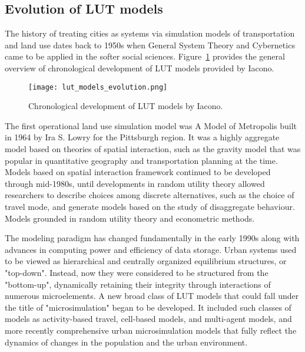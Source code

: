\subsection{Evolution of LUT models} \label{subsec:evolution_of_lut_models}

The history of treating cities as systems via simulation models of transportation and land use dates back to 1950s when General System Theory and Cybernetics came to be applied in the softer social sciences\cite{Batty2008}.
Figure~\ref{fig:lut_model_evolution} provides the general overview of chronological development of LUT models provided by Iacono\cite{Iacono2008}.

\begin{figure}[hbt!]
    \centering
    \texttt{[image: lut\_models\_evolution.png]}
    \caption{Chronological development of LUT models by Iacono\cite{Iacono2008}.}
    \label{fig:lut_model_evolution}
\end{figure}

The first operational land use simulation model was A Model of Metropolis built in 1964 by Ira S. Lowry for the Pittsburgh region\cite{Lowry1964}.
It was a highly aggregate model based on theories of spatial interaction, such as the gravity model that was popular in quantitative geography and transportation planning at the time\cite{Bouchard1965}.
Models based on spatial interaction framework continued to be developed through mid-1980s, until developments in random utility theory allowed researchers to describe choices among discrete alternatives, such as the choice of travel mode, and generate models based on the study of disaggregate behaviour.
Models grounded in random utility theory and econometric methods\cite{Iacono2008}.

The modeling paradigm has changed fundamentally in the early 1990s along with advances in computing power and efficiency of data storage.
Urban systems used to be viewed as hierarchical and centrally organized equilibrium structures, or "top-down".
Instead, now they were considered to be structured from the "bottom-up", dynamically retaining their integrity through interactions of numerous microelements\cite{Batty2008}.
A new broad class of LUT models that could fall under the title of "microsimulation" began to be developed.
It included such classes of models as activity-based travel, cell-based models, and multi-agent models, and more recently comprehensive urban microsimulation models that fully reflect the dynamics of changes in the population and the urban environment\cite{Iacono2008}.



